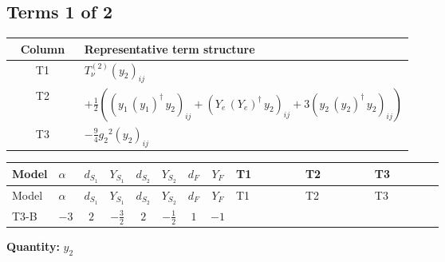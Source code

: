 \documentclass[8pt]{article}
\begin{document}
\begin{landscape}
\subsection*{Terms 1 of 2}
\begin{center}
\begin{tabular}{@{}c >{\raggedright\arraybackslash}p{0.82\linewidth}@{}}
\toprule
Column & Representative term structure \\
\midrule
T1 & \(\displaystyle T_{\nu}^{(2)} \left({y_2}\right)_{ij}\) \\
\midrule
T2 & \(\displaystyle +\frac{1}{2} (\left({y_1}\,\left({y_1}\right)^{\dagger}\,{y_2}\right)_{ij}+\left({Y_e}\,\left({Y_e}\right)^{\dagger}\,{y_2}\right)_{ij}+3 \left({y_2}\,\left({y_2}\right)^{\dagger}\,{y_2}\right)_{ij})\) \\
\midrule
T3 & \(\displaystyle -\frac{9}{4} {g_2}^2 \left({y_2}\right)_{ij}\) \\
\midrule
\bottomrule
\end{tabular}
\end{center}
\smallskip
\tiny
\begin{longtable}{@{}llcccccc >{\raggedright\arraybackslash}p{0.21\linewidth} >{\raggedright\arraybackslash}p{0.21\linewidth} >{\raggedright\arraybackslash}p{0.21\linewidth}@{}}
\toprule
Model & $\alpha$ & $d_{S_1}$ & $Y_{S_1}$ & $d_{S_2}$ & $Y_{S_2}$ & $d_F$ & $Y_F$ & T1 & T2 & T3 \\
\midrule
\endfirsthead
\toprule
Model & $\alpha$ & $d_{S_1}$ & $Y_{S_1}$ & $d_{S_2}$ & $Y_{S_2}$ & $d_F$ & $Y_F$ & T1 & T2 & T3 \\
\midrule
\endhead
T3-B & $-3$ & $2$ & $-\frac{3}{2}$ & $2$ & $-\frac{1}{2}$ & $1$ & $-1$ & \scriptsize\adjustbox{max width=\linewidth}{$\begin{gathered} T_{\nu}^{(2)} \left({y_2}\right)_{ij}\end{gathered}$} & \scriptsize\adjustbox{max width=\linewidth}{$\begin{gathered} +\frac{1}{2} (\left({y_1}\,\left({y_1}\right)^{\dagger}\,{y_2}\right)_{ij}+\left({Y_e}\,\left({Y_e}\right)^{\dagger}\,{y_2}\right)_{ij}+3 \left({y_2}\,\left({y_2}\right)^{\dagger}\,{y_2}\right)_{ij})\end{gathered}$} & \scriptsize\adjustbox{max width=\linewidth}{$\begin{gathered} -\frac{9}{4} {g_2}^2 \left({y_2}\right)_{ij}\end{gathered}$} \\
\midrule
\bottomrule
\end{longtable}
\clearpage
\noindent\textbf{Quantity: }$y_2$\par\smallskip

\end{landscape}
\end{document}
